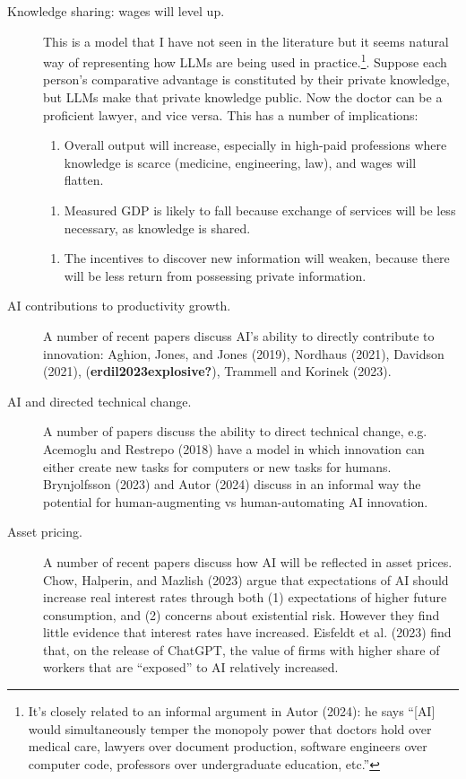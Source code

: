 \documentclass[
  11pt,
  letterpaper,
  DIV=11,
  numbers=noendperiod,
  oneside]{scrartcl}
\providecommand{\tightlist}{%
  \setlength{\itemsep}{0pt}\setlength{\parskip}{0pt}}\usepackage{longtable,booktabs,array}
\begin{document}
\begin{description}
\item[Knowledge sharing: wages will level up.]
This is a model that I have not seen in the literature but it seems
natural way of representing how LLMs are being used in
practice.\footnote{It's closely related to an informal argument in Autor
  (2024): he says ``{[}AI{]} would simultaneously temper the monopoly
  power that doctors hold over medical care, lawyers over document
  production, software engineers over computer code, professors over
  undergraduate education, etc.''}. Suppose each person's comparative
advantage is constituted by their private knowledge, but LLMs make that
private knowledge public. Now the doctor can be a proficient lawyer, and
vice versa. This has a number of implications:

\begin{enumerate}
\def\labelenumi{\arabic{enumi}.}
\tightlist
\item
  Overall output will increase, especially in high-paid professions
  where knowledge is scarce (medicine, engineering, law), and wages will
  flatten.
\end{enumerate}

\begin{enumerate}
\def\labelenumi{\arabic{enumi}.}
\setcounter{enumi}{1}
\tightlist
\item
  Measured GDP is likely to fall because exchange of services will be
  less necessary, as knowledge is shared.
\end{enumerate}

\begin{enumerate}
\def\labelenumi{\arabic{enumi}.}
\setcounter{enumi}{2}
\tightlist
\item
  The incentives to discover new information will weaken, because there
  will be less return from possessing private information.
\end{enumerate}
\item[AI contributions to productivity growth.]
A number of recent papers discuss AI's ability to directly contribute to
innovation: Aghion, Jones, and Jones (2019), Nordhaus (2021), Davidson
(2021), (\textbf{erdil2023explosive?}), Trammell and Korinek (2023).
\item[AI and directed technical change.]
A number of papers discuss the ability to direct technical change, e.g.
Acemoglu and Restrepo (2018) have a model in which innovation can either
create new tasks for computers or new tasks for humans. Brynjolfsson
(2023) and Autor (2024) discuss in an informal way the potential for
human-augmenting vs human-automating AI innovation.
\item[Asset pricing.]
A number of recent papers discuss how AI will be reflected in asset
prices. Chow, Halperin, and Mazlish (2023) argue that expectations of AI
should increase real interest rates through both (1) expectations of
higher future consumption, and (2) concerns about existential risk.
However they find little evidence that interest rates have increased.
Eisfeldt et al. (2023) find that, on the release of ChatGPT, the value
of firms with higher share of workers that are ``exposed'' to AI
relatively increased.
\end{description}
\end{document}
